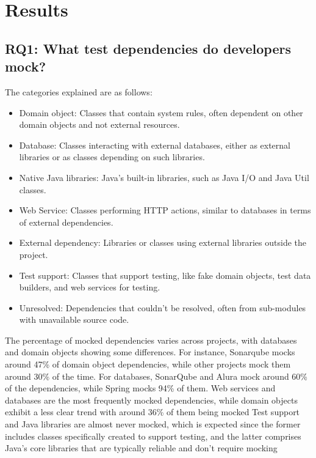 \documentclass[11pt,a4paper]{article}
\begin{document}
\section{Results}

\subsection{RQ1: What test dependencies do developers mock?}

The categories explained are as follows:

\begin{itemize}
    \item Domain object: Classes that contain system rules, often dependent on other domain objects and not external resources.
    \item Database: Classes interacting with external databases, either as external libraries or as classes depending on such libraries.
    \item Native Java libraries: Java's built-in libraries, such as Java I/O and Java Util classes.
    \item Web Service: Classes performing HTTP actions, similar to databases in terms of external dependencies.
    \item External dependency: Libraries or classes using external libraries outside the project.
    \item Test support: Classes that support testing, like fake domain objects, test data builders, and web services for testing.
    \item Unresolved: Dependencies that couldn't be resolved, often from sub-modules with unavailable source code.
\end{itemize}

The percentage of mocked dependencies varies across projects,
with databases and domain objects showing some differences. 
For instance, Sonarqube mocks around 47\% of domain object dependencies, while other projects mock them around 30\% of the time.
For databases, SonarQube and Alura mock around 60\% of the dependencies, while Spring mocks 94\% of them.
Web services and databases are the most frequently mocked dependencies,
while domain objects exhibit a less clear trend with around 36\% of them being mocked
Test support and Java libraries are almost never mocked, which is expected since the former includes classes specifically created to support testing, 
and the latter comprises Java's core libraries that are typically reliable and don't require mocking
\end{document}
